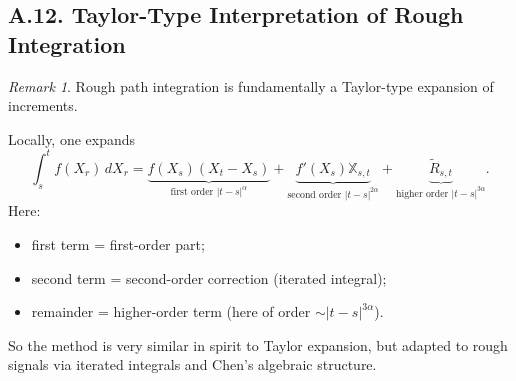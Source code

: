 \documentclass[11pt]{article}
\theoremstyle{definition}
\theoremstyle{remark}
\newtheorem{remark}{Remark}
\begin{document}
\subsection*{A.12. Taylor-Type Interpretation of Rough Integration}
\begin{remark}
Rough path integration is fundamentally a Taylor-type expansion of increments.

Locally, one expands
\[
\int_s^t f(X_r)\,dX_r
=
\underbrace{f(X_s)(X_t-X_s)}_{\text{first order }|t-s|^{\alpha}}
+\underbrace{f'(X_s)\mathbb{X}_{s,t}}_{\text{second order }|t-s|^{2\alpha}}
+\underbrace{\widetilde R_{s,t}}_{\text{higher order }|t-s|^{3\alpha}}.
\]
Here:
\begin{itemize}
\item first term = first-order part;
\item second term = second-order correction (iterated integral);
\item remainder = higher-order term (here of order $\sim |t-s|^{3\alpha}$).
\end{itemize}

So the method is very similar in spirit to Taylor expansion, but adapted to rough signals via iterated integrals and Chen's algebraic structure.
\end{remark}
\end{document}

